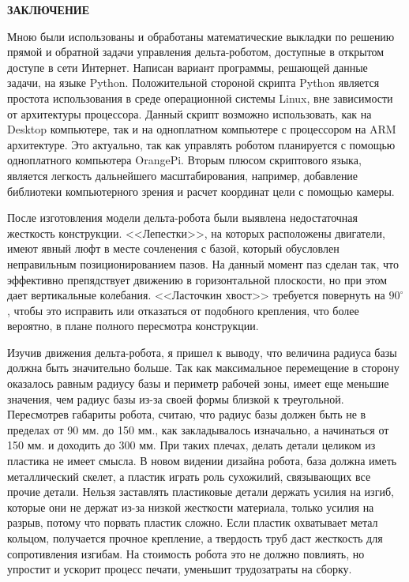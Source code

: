 \begin{center}
\large{\textbf{ЗАКЛЮЧЕНИЕ}}\\
\end{center}
 
Мною были использованы и обработаны математические выкладки по решению прямой и обратной задачи управления дельта-роботом, доступные в открытом доступе в сети Интернет. Написан вариант программы, решающей данные задачи, на языке Python. Положительной стороной скрипта Python является простота  использования в среде операционной системы Linux, вне зависимости от архитектуры процессора. Данный скрипт возможно использовать, как на Desktop компьютере, так и на одноплатном компьютере с процессором на ARM архитектуре. Это актуально, так как управлять роботом планируется с помощью одноплатного компьютера OrangePi. Вторым плюсом скриптового языка, является легкость дальнейшего масштабирования, например, добавление библиотеки компьютерного зрения и расчет координат цели с помощью камеры.    

После изготовления модели дельта-робота были выявлена недостаточная жесткость конструкции. <<Лепестки>>, на которых расположены двигатели, имеют явный люфт в месте сочленения с базой, который обусловлен неправильным позиционированием пазов. На данный момент паз сделан так, что эффективно препядствует движению в горизонтальной плоскости, но при этом дает вертикальные колебания. <<Ласточкин хвост>> требуется повернуть на $90^{\circ}$, чтобы это исправить или отказаться от подобного крепления, что более вероятно, в плане полного пересмотра конструкции.

Изучив движения дельта-робота, я пришел к выводу, что величина радиуса базы должна быть значительно больше. Так как максимальное перемещение в сторону оказалось равным радиусу базы и периметр рабочей зоны, имеет еще меньшие значения, чем радиус базы из-за своей формы близкой к треугольной. Пересмотрев габариты робота, считаю, что радиус базы должен быть не в пределах от 90 мм. до 150 мм., как закладывалось изначально, а начинаться от 150 мм. и доходить до 300 мм.  При таких плечах, делать детали целиком из пластика не имеет смысла. В новом видении дизайна робота, база должна иметь металлический скелет, а пластик играть роль сухожилий, связывающих все прочие детали. Нельзя заставлять пластиковые детали держать усилия на изгиб, которые они не держат из-за низкой жесткости материала, только усилия на разрыв, потому что порвать пластик сложно. Если пластик охватывает метал кольцом, получается прочное крепление, а твердость труб даст жесткость для сопротивления изгибам. На стоимость робота это не должно повлиять, но упростит и ускорит процесс печати, уменьшит трудозатраты на сборку.

